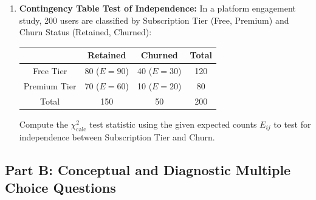 \begin{enumerate}
\item \textbf{Contingency Table Test of Independence:} In a platform engagement study, 200 users are classified by Subscription Tier (Free, Premium) and Churn Status (Retained, Churned):
\begin{center}
\begin{tabular}{c|cc|c}
& Retained & Churned & Total \\
\hline
Free Tier & 80 ($E=90$) & 40 ($E=30$) & 120 \\
Premium Tier & 70 ($E=60$) & 10 ($E=20$) & 80 \\
\hline
Total & 150 & 50 & 200 \\
\end{tabular}
\end{center}
Compute the $\chi_{\text{calc}}^2$ test statistic using the given expected counts $E_{ij}$ to test for independence between Subscription Tier and Churn.
\end{enumerate}

\subsection*{Part B: Conceptual and Diagnostic Multiple Choice Questions}

